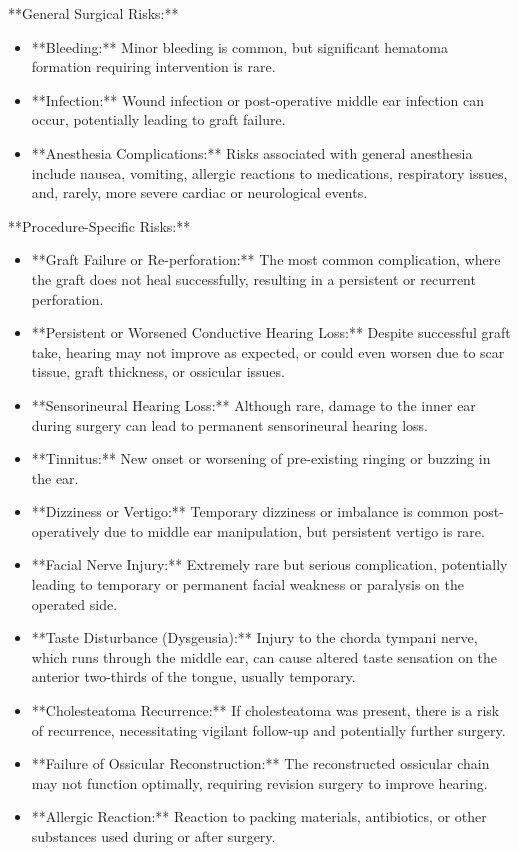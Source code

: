 **General Surgical Risks:**

\begin{itemize}
  \item **Bleeding:** Minor bleeding is common, but significant hematoma formation requiring intervention is rare.
  \item **Infection:** Wound infection or post-operative middle ear infection can occur, potentially leading to graft failure.
  \item **Anesthesia Complications:** Risks associated with general anesthesia include nausea, vomiting, allergic reactions to medications, respiratory issues, and, rarely, more severe cardiac or neurological events.
\end{itemize}

**Procedure-Specific Risks:**

\begin{itemize}
  \item **Graft Failure or Re-perforation:** The most common complication, where the graft does not heal successfully, resulting in a persistent or recurrent perforation.
  \item **Persistent or Worsened Conductive Hearing Loss:** Despite successful graft take, hearing may not improve as expected, or could even worsen due to scar tissue, graft thickness, or ossicular issues.
  \item **Sensorineural Hearing Loss:** Although rare, damage to the inner ear during surgery can lead to permanent sensorineural hearing loss.
  \item **Tinnitus:** New onset or worsening of pre-existing ringing or buzzing in the ear.
  \item **Dizziness or Vertigo:** Temporary dizziness or imbalance is common post-operatively due to middle ear manipulation, but persistent vertigo is rare.
  \item **Facial Nerve Injury:** Extremely rare but serious complication, potentially leading to temporary or permanent facial weakness or paralysis on the operated side.
  \item **Taste Disturbance (Dysgeusia):** Injury to the chorda tympani nerve, which runs through the middle ear, can cause altered taste sensation on the anterior two-thirds of the tongue, usually temporary.
  \item **Cholesteatoma Recurrence:** If cholesteatoma was present, there is a risk of recurrence, necessitating vigilant follow-up and potentially further surgery.
  \item **Failure of Ossicular Reconstruction:** The reconstructed ossicular chain may not function optimally, requiring revision surgery to improve hearing.
  \item **Allergic Reaction:** Reaction to packing materials, antibiotics, or other substances used during or after surgery.
\end{itemize}

